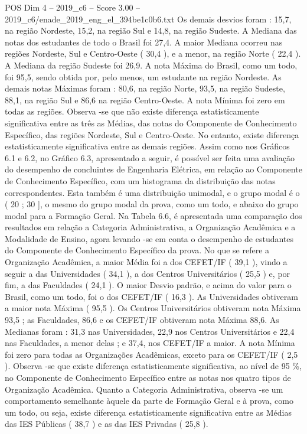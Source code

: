 \begin{textsample}{POS Dim 4 – 2019\_c6 – Score 3.00 – 2019\_c6/enade\_2019\_eng\_el\_394be1c0b6.txt}
Os demais desvios foram : 15,7, na região Nordeste, 15,2, na região Sul e 14,8, na região Sudeste.
A Mediana das notas dos estudantes de todo o Brasil foi 27,4.
A maior Mediana ocorreu nas regiões Nordeste, Sul e Centro-Oeste ( 30,4 ), e a menor, na região Norte ( 22,4 ).
A Mediana da região Sudeste foi 26,9.
A nota Máxima do Brasil, como um todo, foi 95,5, sendo obtida por, pelo menos, um estudante na região Nordeste.
As demais notas Máximas foram : 80,6, na região Norte, 93,5, na região Sudeste, 88,1, na região Sul e 86,6 na região Centro-Oeste.
A nota Mínima foi zero em todas as regiões.
Observa -se que não existe diferença estatisticamente significativa entre as três as Médias, das notas do Componente de Conhecimento Específico, das regiões Nordeste, Sul e Centro-Oeste.
No entanto, existe diferença estatisticamente significativa entre as demais regiões.
Assim como nos Gráficos 6.1 e 6.2, no Gráfico 6.3, apresentado a seguir, é possível ser feita uma avaliação do desempenho de concluintes de Engenharia Elétrica, em relação ao Componente de Conhecimento Específico, com um histograma da distribuição das notas correspondentes.
Esta também é uma distribuição unimodal, e o grupo modal é o ( 20 ; 30 ], o mesmo do grupo modal da prova, como um todo, e abaixo do grupo modal para a Formação Geral.
Na Tabela 6.6, é apresentada uma comparação dos resultados em relação a Categoria Administrativa, a Organização Acadêmica e a Modalidade de Ensino, agora levando -se em conta o desempenho de estudantes do Componente de Conhecimento Específico da prova.
No que se refere a Organização Acadêmica, a maior Média foi a dos CEFET/IF ( 39,1 ), vindo a seguir a das Universidades ( 34,1 ), a dos Centros Universitários ( 25,5 ) e, por fim, a das Faculdades ( 24,1 ).
O maior Desvio padrão, e acima do valor para o Brasil, como um todo, foi o dos CEFET/IF ( 16,3 ).
As Universidades obtiveram a maior nota Máxima ( 95,5 ).
Os Centros Universitários obtiveram nota Máxima 93,5 ; as Faculdades, 86,6 e os CEFET/IF obtiveram nota Máxima 88,6.
As Medianas foram : 31,3 nas Universidades, 22,9 nos Centros Universitários e 22,4 nas Faculdades, a menor delas ; e 37,4, nos CEFET/IF a maior.
A nota Mínima foi zero para todas as Organizações Acadêmicas, exceto para os CEFET/IF ( 2,5 ).
Observa -se que existe diferença estatisticamente significativa, ao nível de 95 \%, no Componente de Conhecimento Específico entre as notas nos quatro tipos de Organização Acadêmica.
Quanto a Categoria Administrativa, observa -se um comportamento semelhante àquele da parte de Formação Geral e à prova, como um todo, ou seja, existe diferença estatisticamente significativa entre as Médias das IES Públicas ( 38,7 ) e as das IES Privadas ( 25,8 ).

\end{textsample}
